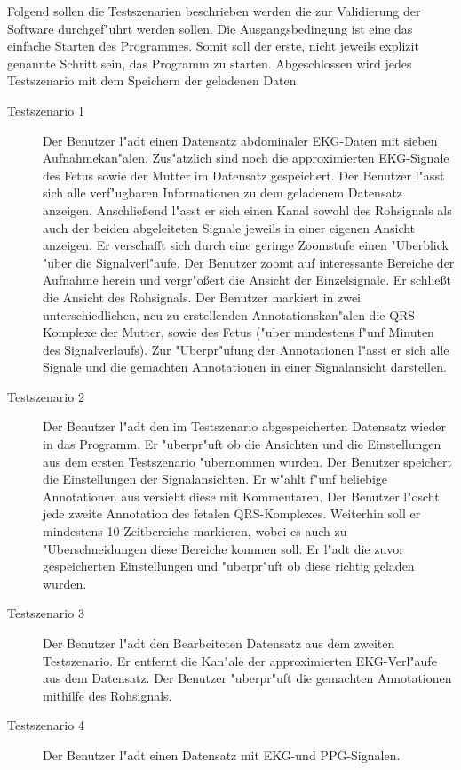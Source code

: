 Folgend sollen die Testszenarien beschrieben werden die zur Validierung der Software durchgef"uhrt werden sollen.
Die Ausgangsbedingung ist eine das einfache Starten des Programmes.
Somit soll der erste, nicht jeweils explizit genannte Schritt sein, das Programm zu starten.
Abgeschlossen wird jedes Testszenario mit dem Speichern der geladenen Daten.
\begin{description}
\item[Testszenario 1] Der Benutzer l"adt einen Datensatz abdominaler \ac{EKG}-Daten mit sieben Aufnahmekan"alen.
					  Zus"atzlich sind noch die approximierten \ac{EKG}-Signale des Fetus sowie der Mutter im Datensatz gespeichert.
					  Der Benutzer l"asst sich alle verf"ugbaren Informationen zu dem geladenem Datensatz anzeigen.
					  Anschlie\ss end l"asst er sich einen Kanal sowohl des Rohsignals als auch der beiden abgeleiteten Signale jeweils in einer eigenen Ansicht anzeigen.
					  Er verschafft sich durch eine geringe Zoomstufe einen "Uberblick "uber die Signalverl"aufe.
					  Der Benutzer zoomt auf interessante Bereiche der Aufnahme herein und vergr"o\ss ert die Ansicht der Einzelsignale.
					  Er schlie{\ss}t die Ansicht des Rohsignals.
					  Der Benutzer markiert in zwei unterschiedlichen, neu zu erstellenden Annotationskan"alen die QRS-Komplexe der Mutter, sowie des Fetus ("uber mindestens f"unf Minuten des Signalverlaufs).
					  Zur "Uberpr"ufung der Annotationen l"asst er sich alle Signale und die gemachten Annotationen in einer Signalansicht darstellen.
\item[Testszenario 2] Der Benutzer l"adt den im Testszenario abgespeicherten Datensatz wieder in das Programm.
					  Er "uberpr"uft ob die Ansichten und die Einstellungen aus dem ersten Testszenario "ubernommen wurden.
					  Der Benutzer speichert die Einstellungen der Signalansichten.
					  Er w"ahlt f"unf beliebige Annotationen aus versieht diese mit Kommentaren.
					  Der Benutzer l"oscht jede zweite Annotation des fetalen QRS-Komplexes.
					  Weiterhin soll er mindestens 10 Zeitbereiche markieren, wobei es auch zu "Uberschneidungen diese Bereiche kommen soll.
					  Er l"adt die zuvor gespeicherten Einstellungen und "uberpr"uft ob diese richtig geladen wurden.
\item[Testszenario 3] Der Benutzer l"adt den Bearbeiteten Datensatz aus dem zweiten Testszenario.
					  Er entfernt die Kan"ale der approximierten \ac{EKG}-Verl"aufe aus dem Datensatz.
					  Der Benutzer "uberpr"uft die gemachten Annotationen mithilfe des Rohsignals.
\item[Testszenario 4] Der Benutzer l"adt einen Datensatz mit \ac{EKG}-und \ac{PPG}-Signalen.

\end{description}
